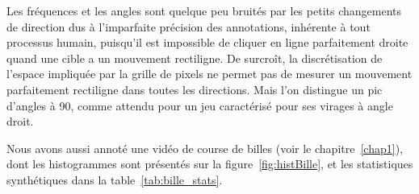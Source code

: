 	Les fréquences et les angles sont quelque peu bruités par les petits changements de direction dus à l'imparfaite précision des annotations, inhérente à tout processus humain, puisqu'il est impossible de cliquer en ligne parfaitement droite quand une cible a un mouvement rectiligne. De surcroît, la discrétisation de l'espace impliquée par la grille de pixels ne permet pas de mesurer un mouvement parfaitement rectiligne dans toutes les directions. Mais l'on distingue un pic d'angles à 90\textdegree{}, comme attendu pour un jeu caractérisé pour ses virages à angle droit.	

	Nous avons aussi annoté une vidéo de course de billes (voir le chapitre~\ref{chap1}), dont les histogrammes sont présentés sur la figure~\ref{fig:histBille}, et les statistiques synthétiques dans la table~\ref{tab:bille_stats}.
	
